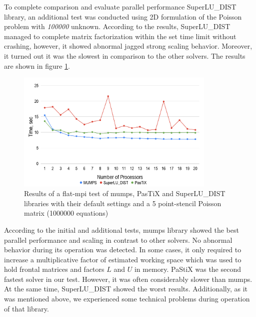
To complete comparison and evaluate parallel performance SuperLU\_DIST library, an additional test was conducted using 2D formulation of the Poisson problem with \textit{100000} unknown. According to the results, SuperLU\_DIST managed to complete matrix factorization within the set time limit without crashing, however, it showed abnormal jagged strong scaling behavior. Moreover, it turned out it was the slowest in comparison to the other solvers. The results are shown in figure \ref{fig:5-point-stencil-solvers-comparison}.\\



\figpointer{\ref{fig:5-point-stencil-solvers-comparison}}
\begin{figure}[htpb]
  \centering
  \includegraphics[width=0.85\textwidth]{figures/chapter-2/solvers-comparison-5-point-stencil.png}
\caption{Results of a flat-\gls{mpi} test of \gls{mumps}, PasTiX and SuperLU\_DIST libraries with their default settings and a 5 point-stencil Poisson matrix (1000000  equations)}
\label{fig:5-point-stencil-solvers-comparison}
\end{figure}


According to the initial and additional tests, \gls{mumps} library showed the best parallel performance and scaling in contrast to other solvers. No abnormal behavior during its operation was detected. In some cases, it only required to increase a multiplicative factor of estimated working space which was used to hold frontal matrices and factors $L$ and $U$ in memory. PaStiX was the second fastest solver in our test. However,  it was often considerably slower than \gls{mumps}. At the same time, SuperLU\_DIST showed the worst results. Additionally, as it was mentioned above, we experienced some technical problems during operation of that library.\\


